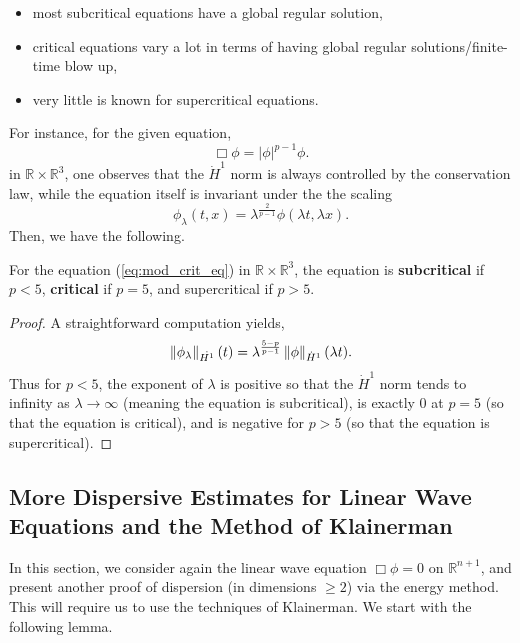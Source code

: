 \documentclass{article}
\begin{document}
\begin{itemize}[itemsep =-2pt]
	\item most subcritical equations have a global regular solution, 
	\item critical equations vary a lot in terms of having global regular solutions/finite-time blow up, 
	\item very little is known for supercritical equations. 
\end{itemize}
For instance, for the given equation, 
\begin{equation}
	\Box\phi = |\phi|^{p - 1}\phi. 
	\label{eq:mod_crit_eq}
\end{equation}
in $\mathbb{R} \times \mathbb{R}^{3}$, one observes that the $\dot{H}^{1}$ norm is always controlled by the conservation law, while the equation itself is invariant under the the scaling 
\begin{equation*}
	\phi_{\lambda}(t, x) = \lambda^{\frac{2}{p - 1}}\phi(\lambda t,\lambda x). 
\end{equation*} 
Then, we have the following. 
\begin{prop}
	For the equation (\ref{eq:mod_crit_eq}) in $\mathbb{R} \times \mathbb{R}^{3}$, the equation is \textbf{subcritical} if $p < 5$, \textbf{critical} if $p = 5$, and supercritical if $p > 5$. 
\end{prop} 
\begin{proof}
	A straightforward computation yields, 
	\begin{equation*}
		\left\Vert \phi_{\lambda} \right\Vert_{\dot{H^{1}}}(t) = \lambda^{\frac{5 - p}{p - 1}}\left\Vert \phi \right\Vert_{\dot{H}^{1}}(\lambda t). 
	\end{equation*}
	Thus for $p < 5$, the exponent of $\lambda$ is positive so that the $\dot{H}^{1}$ norm tends to infinity as $\lambda \to \infty$ (meaning the equation is subcritical), is exactly 0 at $p = 5$ (so that the equation is critical), and is negative for $p > 5$ (so that the equation is supercritical). 
\end{proof}

\newpage 
\subsection{More Dispersive Estimates for Linear Wave Equations and the Method of Klainerman}

In this section, we consider again the linear wave equation $\Box\phi = 0$ on $\mathbb{R}^{n + 1}$, and present another proof of dispersion (in dimensions $\geq 2$) via the energy method. This will require us to use the techniques of Klainerman. We start with the following lemma. 
\end{document}

